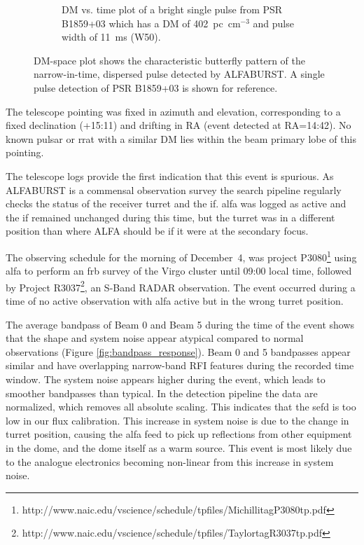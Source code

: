 \documentclass[a4paper,fleqn,usenatbib]{mnras}
\begin{document}
\begin{figure}
\begin{subfigure}[t]{0.5\textwidth}
        \caption{DM vs. time plot of a bright single pulse from PSR B1859+03
        which has a DM of 402~pc~cm$^{-3}$ and pulse width of 11~ms (W50).
        }
        \label{fig:dm_time_B1859}
    \end{subfigure}
    \caption{DM-space plot shows the characteristic butterfly pattern of the
    narrow-in-time, dispersed pulse detected by ALFABURST. A single pulse
    detection of PSR B1859+03 is shown for reference.
    }
    \label{fig:dm_time}
\end{figure}

The telescope pointing was fixed in azimuth and elevation, corresponding to a
fixed declination (+15:11) and drifting in RA (event detected at RA=14:42). No
known pulsar or \gls{rrat} with a similar DM lies within the beam primary lobe
of this pointing.

The telescope logs provide the first indication that this event is spurious. As
ALFABURST is a commensal observation survey the search pipeline regularly checks
the status of the receiver turret and the \gls{if}. \gls{alfa} was logged as
active and the \gls{if} remained unchanged during this time, but the turret was
in a different position than where ALFA should be if it were at the secondary
focus.

The observing schedule for the morning of December~4, was project
P3080\footnote{http://www.naic.edu/vscience/schedule/tpfiles/MichillitagP3080tp.pdf}
using \gls{alfa} to perform an \gls{frb} survey of the Virgo cluster until 09:00
local time, followed by Project
R3037\footnote{http://www.naic.edu/vscience/schedule/tpfiles/TaylortagR3037tp.pdf},
an S-Band RADAR observation.  The event occurred during a time of no active
observation with \gls{alfa} active but in the wrong turret position.

The average bandpass of Beam 0 and Beam 5 during the time of the event shows
that the shape and system noise appear atypical compared to normal observations
(Figure \ref{fig:bandpass_response}).  Beam 0 and 5 bandpasses appear similar
and have overlapping narrow-band RFI features during the recorded time window.
The system noise appears higher during the event, which leads to smoother
bandpasses than typical.  In the detection pipeline the data are normalized,
which removes all absolute scaling. This indicates that the \gls{sefd} is too
low in our flux calibration.  This increase in system noise is due to the change
in turret position, causing the \gls{alfa} feed to pick up reflections from
other equipment in the dome, and the dome itself as a warm source.  This event
is most likely due to the analogue electronics becoming non-linear from this
increase in system noise.
\end{document}
